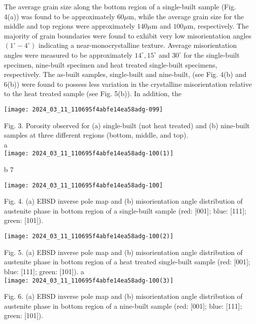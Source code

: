 \documentclass[10pt]{article}
\begin{document}
The average grain size along the bottom region of a single-built sample (Fig. 4(a)) was found to be approximately $60 \mu \mathrm{m}$, while the average grain size for the middle and top regions were approximately $140 \mu \mathrm{m}$ and $100 \mu \mathrm{m}$, respectively. The majority of grain boundaries were found to exhibit very low misorientation angles $\left(1^{\circ}-4^{\circ}\right)$ indicating a near-monocrystalline texture. Average misorientation angles were measured to be approximately $14^{\circ}, 15^{\circ}$ and $30^{\circ}$ for the single-built specimen, nine-built specimen and heat treated single-built specimens, respectively. The as-built samples, single-built and nine-built, (see Fig. 4(b) and 6(b)) were found to possess less variation in the crystalline misorientation relative to the heat treated sample (see Fig. 5(b)). In addition, the

\begin{center}
\texttt{[image: 2024\_03\_11\_110695f4abfe14ea58adg-099]}
\end{center}

Fig. 3. Porosity observed for (a) single-built (not heat treated) and (b) nine-built samples at three different regions (bottom, middle, and top).\\
a\\
\texttt{[image: 2024\_03\_11\_110695f4abfe14ea58adg-100(1)]}

b 7

\begin{center}
\texttt{[image: 2024\_03\_11\_110695f4abfe14ea58adg-100]}
\end{center}

Fig. 4. (a) EBSD inverse pole map and (b) misorientation angle distribution of austenite phase in bottom region of a single-built sample (red: [001]; blue: [111]; green: [101]).

\begin{center}
\texttt{[image: 2024\_03\_11\_110695f4abfe14ea58adg-100(2)]}
\end{center}

Fig. 5. (a) EBSD inverse pole map and (b) misorientation angle distribution of austenite phase in bottom region of a heat treated single-built sample (red: [001]; blue: [111]; green: [101]). a\\
\texttt{[image: 2024\_03\_11\_110695f4abfe14ea58adg-100(3)]}

Fig. 6. (a) EBSD inverse pole map and (b) misorientation angle distribution of austenite phase in bottom region of a nine-built sample (red: [001]; blue: [111]; green: [101]).
\end{document}
